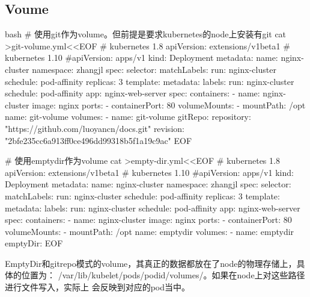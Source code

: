 \subsection{Voume}
\begin{code-block}{bash}
# 使用git作为volume。但前提是要求kubernetes的node上安装有git
cat >git-volume.yml<<EOF
# kubernetes 1.8
apiVersion: extensions/v1beta1
# kubernetes 1.10
#apiVersion: apps/v1
kind: Deployment
metadata:
  name: nginx-cluster
  namespace: zhangjl
spec:
  selector:
    matchLabels:
      run: nginx-cluster
      schedule: pod-affinity
  replicas: 3
  template:
    metadata:
      labels:
        run: nginx-cluster
        schedule: pod-affinity
        app: nginx-web-server
    spec:
      containers:
      - name: nginx-cluster
        image: nginx
        ports:
        - containerPort: 80
        volumeMounts:
          - mountPath: /opt
            name: git-volume
      volumes:
      - name: git-volume
        gitRepo:
          repository: "https://github.com/luoyancn/docs.git"
          revision: "2bfe235cc6a913ff0ce496dd99318b5f1a19c9ac"
EOF

# 使用emptydir作为volume
cat >empty-dir.yml<<EOF
# kubernetes 1.8
apiVersion: extensions/v1beta1
# kubernetes 1.10
#apiVersion: apps/v1
kind: Deployment
metadata:
  name: nginx-cluster
  namespace: zhangjl
spec:
  selector:
    matchLabels:
      run: nginx-cluster
      schedule: pod-affinity
  replicas: 3
  template:
    metadata:
      labels:
        run: nginx-cluster
        schedule: pod-affinity
        app: nginx-web-server
    spec:
      containers:
      - name: nginx-cluster
        image: nginx
        ports:
        - containerPort: 80
        volumeMounts:
          - mountPath: /opt
            name: emptydir
      volumes:
      - name: emptydir
        emptyDir: {}
EOF
\end{code-block}
EmptyDir和gitrepo模式的volume，其真正的数据都放在了node的物理存储上，具体的位置为：
/var/lib/kubelet/pods/{podid}/volumes/。如果在node上对这些路径进行文件写入，实际上
会反映到对应的pod当中。

